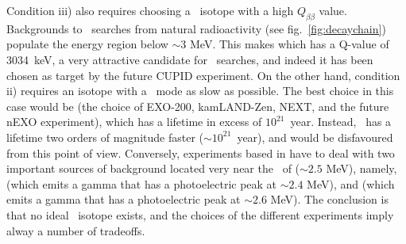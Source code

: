 Condition iii) also requires choosing a \bb\ isotope with a high $Q_{\beta\beta}$ value. Backgrounds to \bbonu\ searches from natural radioactivity (see fig.~\ref{fig:decaychain}) populate the energy region below $\sim$3 MeV. This makes  which has a Q-value of 3034~keV, a very attractive candidate for \bbonu\ searches, and indeed it has been chosen as target by the future CUPID experiment. On the other hand, condition ii) requires an isotope with a \bbtnu\ mode as slow as possible. The best choice in this case would be  (the choice of EXO-200, kamLAND-Zen, NEXT, and the future nEXO experiment), which has a lifetime in excess of $10^21$~year. Instead, \ has a lifetime two orders of magnitude faster ($\sim 10^21$~year), and would be disfavoured from this point of view. Conversely, experiments based in  have to deal with two important sources of background located very near the \Qbb\ of  ($\sim 2.5$ MeV), namely, 
 (which emits a gamma that has a photoelectric peak at $\sim 2.4$ MeV), and  (which emits a gamma that has a photoelectric peak at $\sim 2.6$ MeV). The conclusion is that no ideal \bbonu\ isotope exists, and the choices of the different experiments imply alway a number of tradeoffs. 
